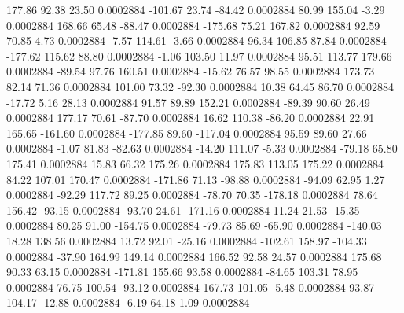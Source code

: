       177.86       92.38       23.50     0.0002884
     -101.67       23.74      -84.42     0.0002884
       80.99      155.04       -3.29     0.0002884
      168.66       65.48      -88.47     0.0002884
     -175.68       75.21      167.82     0.0002884
       92.59       70.85        4.73     0.0002884
       -7.57      114.61       -3.66     0.0002884
       96.34      106.85       87.84     0.0002884
     -177.62      115.62       88.80     0.0002884
       -1.06      103.50       11.97     0.0002884
       95.51      113.77      179.66     0.0002884
      -89.54       97.76      160.51     0.0002884
      -15.62       76.57       98.55     0.0002884
      173.73       82.14       71.36     0.0002884
      101.00       73.32      -92.30     0.0002884
       10.38       64.45       86.70     0.0002884
      -17.72        5.16       28.13     0.0002884
       91.57       89.89      152.21     0.0002884
      -89.39       90.60       26.49     0.0002884
      177.17       70.61      -87.70     0.0002884
       16.62      110.38      -86.20     0.0002884
       22.91      165.65     -161.60     0.0002884
     -177.85       89.60     -117.04     0.0002884
       95.59       89.60       27.66     0.0002884
       -1.07       81.83      -82.63     0.0002884
      -14.20      111.07       -5.33     0.0002884
      -79.18       65.80      175.41     0.0002884
       15.83       66.32      175.26     0.0002884
      175.83      113.05      175.22     0.0002884
       84.22      107.01      170.47     0.0002884
     -171.86       71.13      -98.88     0.0002884
      -94.09       62.95        1.27     0.0002884
      -92.29      117.72       89.25     0.0002884
      -78.70       70.35     -178.18     0.0002884
       78.64      156.42      -93.15     0.0002884
      -93.70       24.61     -171.16     0.0002884
       11.24       21.53      -15.35     0.0002884
       80.25       91.00     -154.75     0.0002884
      -79.73       85.69      -65.90     0.0002884
     -140.03       18.28      138.56     0.0002884
       13.72       92.01      -25.16     0.0002884
     -102.61      158.97     -104.33     0.0002884
      -37.90      164.99      149.14     0.0002884
      166.52       92.58       24.57     0.0002884
      175.68       90.33       63.15     0.0002884
     -171.81      155.66       93.58     0.0002884
      -84.65      103.31       78.95     0.0002884
       76.75      100.54      -93.12     0.0002884
      167.73      101.05       -5.48     0.0002884
       93.87      104.17      -12.88     0.0002884
       -6.19       64.18        1.09     0.0002884
